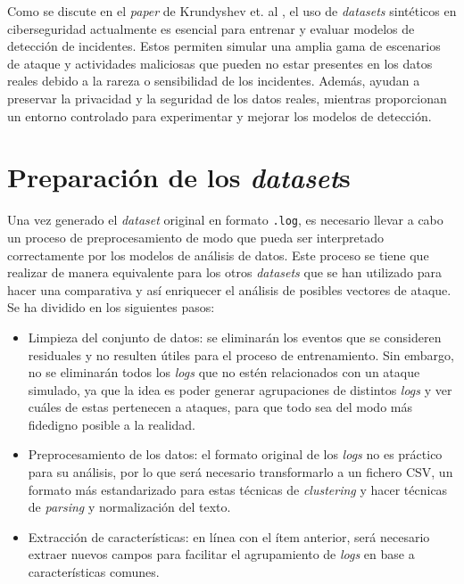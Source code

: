 Como se discute en el \textit{paper} de Krundyshev et. al \cite{inproceedings}, el uso de \textit{datasets} sintéticos en ciberseguridad actualmente es esencial para entrenar y evaluar modelos de detección de incidentes. Estos permiten simular una amplia gama de escenarios de ataque y actividades maliciosas que pueden no estar presentes en los datos reales debido a la rareza o sensibilidad de los incidentes. Además, ayudan a preservar la privacidad y la seguridad de los datos reales, mientras proporcionan un entorno controlado para experimentar y mejorar los modelos de detección. 


\newpage


\section{Preparación de los \textit{dataset}s}


Una vez generado el \textit{dataset} original en formato \texttt{.log}, es necesario llevar a cabo un proceso de preprocesamiento de modo que pueda ser interpretado correctamente por los modelos de análisis de datos. Este proceso se tiene que realizar de manera equivalente para los otros \textit{datasets} que se han utilizado para hacer una comparativa y así enriquecer el análisis de posibles vectores de ataque. Se ha dividido en los siguientes pasos:

\begin{itemize}
    \item Limpieza del conjunto de datos: se eliminarán los eventos que se consideren residuales y no resulten útiles para el proceso de entrenamiento. Sin embargo, no se eliminarán todos los \textit{logs} que no estén relacionados con un ataque simulado, ya que la idea es poder generar agrupaciones de distintos \textit{logs} y ver cuáles de estas pertenecen a ataques, para que todo sea del modo más fidedigno posible a la realidad. 
    \item Preprocesamiento de los datos: el formato original de los \textit{logs} no es práctico para su análisis, por lo que será necesario transformarlo a un fichero \gls{CSV}, un formato más estandarizado para estas técnicas de \textit{clustering} y hacer técnicas de \textit{parsing} y normalización del texto.
    \item Extracción de características: en línea con el ítem anterior, será necesario extraer nuevos campos para facilitar el agrupamiento de \textit{logs} en base a características comunes.
\end{itemize}

